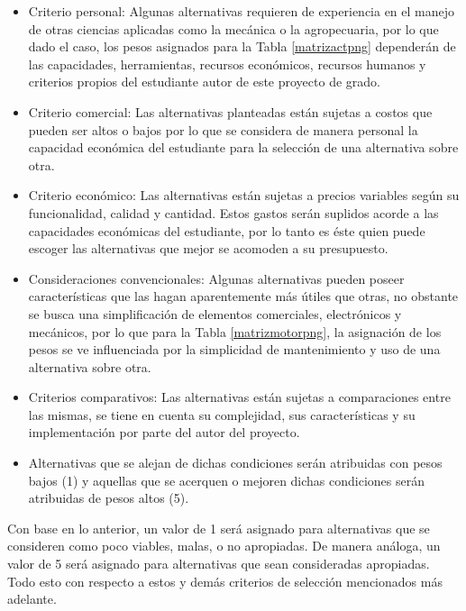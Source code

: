 \begin{itemize}
    \item Criterio personal: Algunas alternativas requieren de experiencia en el manejo de otras ciencias aplicadas como la mecánica o la agropecuaria, por lo que dado el caso, los pesos asignados para la Tabla \ref{matrizactpng} dependerán de las capacidades, herramientas, recursos económicos, recursos humanos y criterios propios del estudiante autor de este proyecto de grado.
    \item Criterio comercial: Las alternativas planteadas están sujetas a costos que pueden ser altos o bajos por lo que se considera de manera personal la capacidad económica del estudiante para la selección de una alternativa sobre otra.
    \item Criterio económico: Las alternativas están sujetas a precios variables según su funcionalidad, calidad y cantidad. Estos gastos serán suplidos acorde a las capacidades económicas del estudiante, por lo tanto es éste quien puede escoger las alternativas que mejor se acomoden a su presupuesto.
    \item Consideraciones convencionales: Algunas alternativas pueden poseer características que las hagan aparentemente más útiles que otras, no obstante se busca una simplificación de elementos comerciales, electrónicos y mecánicos, por lo que para la Tabla \ref{matrizmotorpng}, la asignación de los pesos se ve influenciada por la simplicidad de mantenimiento y uso de una alternativa sobre otra.
    \item Criterios comparativos: Las alternativas están sujetas a comparaciones entre las mismas, se tiene en cuenta su complejidad, sus características y su implementación por parte del autor del proyecto.
    \item Alternativas que se alejan de dichas condiciones serán atribuidas con pesos bajos (1) y aquellas que se acerquen o mejoren dichas condiciones serán atribuidas de pesos altos (5).
\end{itemize}

Con base en lo anterior, un valor de 1 será asignado para alternativas que se consideren como poco viables, malas, o no apropiadas. De manera análoga, un valor de 5 será asignado para alternativas que sean consideradas apropiadas. Todo esto con respecto a estos y demás criterios de selección mencionados más adelante.






%
%
%
%	 
